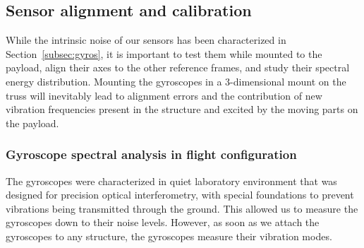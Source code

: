 \subsection{Sensor alignment and calibration}
While the intrinsic noise of our sensors has been characterized in Section~\ref{subsec:gyros}, it is important to test them while mounted to the payload, align their axes to the other reference frames, and study their spectral energy distribution. Mounting the gyroscopes in a 3-dimensional mount on the truss will inevitably lead to alignment errors and the contribution of new vibration frequencies present in the structure and excited by the moving parts on the payload.


\subsubsection{Gyroscope spectral analysis in flight configuration}

The gyroscopes were characterized in quiet laboratory environment that was designed for precision optical interferometry, with special foundations to prevent vibrations being transmitted through the ground. This allowed us to measure the gyroscopes down to their noise levels. However, as soon as we attach the gyroscopes to any structure, the gyroscopes measure their vibration modes. 



